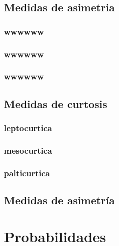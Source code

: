 \documentclass[10pt,]{krantz}
\theoremstyle{definition}
\theoremstyle{definition}
\theoremstyle{definition}
\theoremstyle{definition}
\theoremstyle{remark}
\begin{document}
\hypertarget{medidas-de-asimetria}{%
\chapter{Medidas de asimetria}\label{medidas-de-asimetria}}

\hypertarget{wwwwww}{%
\section{wwwwww}\label{wwwwww}}

\hypertarget{wwwwww-1}{%
\section{wwwwww}\label{wwwwww-1}}

\hypertarget{wwwwww-2}{%
\section{wwwwww}\label{wwwwww-2}}

\hypertarget{medidas-de-curtosis}{%
\chapter{Medidas de curtosis}\label{medidas-de-curtosis}}

\hypertarget{leptocurtica}{%
\section{leptocurtica}\label{leptocurtica}}

\hypertarget{mesocurtica}{%
\section{mesocurtica}\label{mesocurtica}}

\hypertarget{palticurtica}{%
\section{palticurtica}\label{palticurtica}}

\hypertarget{medidas-de-asimetruxeda}{%
\chapter{Medidas de asimetría}\label{medidas-de-asimetruxeda}}

\hypertarget{part-probabilidades}{%
\part{Probabilidades}\label{part-probabilidades}}
\end{document}
